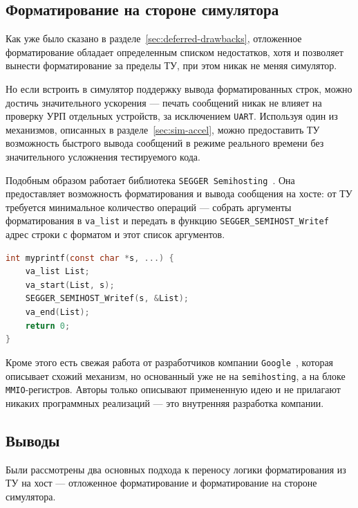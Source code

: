 \subsection{Форматирование на стороне симулятора}

Как уже было сказано в разделе~\ref{sec:deferred-drawbacks}, отложенное форматирование обладает определенным списком недостатков, хотя и позволяет вынести форматирование за пределы ТУ, при этом никак не меняя симулятор.

Но если встроить в симулятор поддержку вывода форматированных строк, можно достичь значительного ускорения --- печать сообщений никак не влияет на проверку УРП отдельных устройств, за исключением \texttt{UART}.
Используя один из механизмов, описанных в разделе~\ref{sec:sim-accel}, можно предоставить ТУ возможность быстрого вывода сообщений в режиме реального времени без значительного усложнения тестируемого кода.

Подобным образом работает библиотека \texttt{SEGGER Semihosting}~\cite{SeggerSemihost}. Она предоставляет возможность форматирования и вывода сообщения на хосте: от ТУ требуется минимальное количество операций --- собрать аргументы форматирования в \verb|va_list| и передать в функцию \verb|SEGGER_SEMIHOST_Writef| адрес строки с форматом и этот список аргументов.

\begin{lstlisting}[language=C, caption={Обёртка \texttt{printf} через \texttt{SYS\_WRITEF}},
                  label={lst:segger-writef}]
int myprintf(const char *s, ...) {
    va_list List;
    va_start(List, s);
    SEGGER_SEMIHOST_Writef(s, &List);
    va_end(List);
    return 0;
}
\end{lstlisting}

Кроме этого есть свежая работа от разработчиков компании \texttt{Google}~\cite{Keller26HostPrintf}, которая описывает схожий механизм, но основанный уже не на \texttt{semihosting}, а на блоке \texttt{MMIO}-регистров. Авторы только описывают примененную идею и не прилагают никаких программных реализаций --- это внутренняя разработка компании.


\subsection{Выводы}

Были рассмотрены два основных подхода к переносу логики форматирования из ТУ на хост --- отложенное форматирование и форматирование на стороне симулятора.

